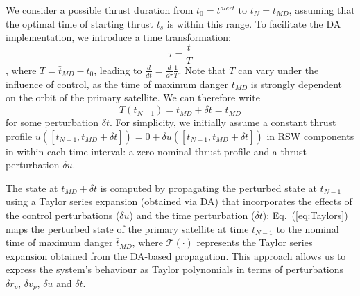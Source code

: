 \documentclass[letterpaper, preprint, paper,11pt]{AAS}	%
\renewcommand{\eqref}[1]{Eq.~(\ref{#1})}
\begin{document}
We consider a possible thrust duration from $t_0 = t^{alert}$ to $t_N = \bar{t}_{MD}$, assuming that the optimal time of starting thrust $t_s$ is within this range. To facilitate the DA implementation, we introduce a time transformation:
\begin{equation}\label{eq:Tau}
	\tau = \frac{t}{T} 	
\end{equation} 
, where $T = \bar{t}_{MD} - t_0$, leading to $\frac{d}{dt} = \frac{d}{d \tau} \frac{1}{T}$. Note that $T$ can vary under the influence of control, as the time of maximum danger $t_{MD}$ is strongly dependent on the orbit of the primary satellite. We can therefore write 
\begin{equation}
	T(t_{N-1}) = \bar{t}_{MD} + \delta t = t_{MD}
\end{equation}
for some perturbation $\delta t$. For simplicity, we initially assume a constant thrust profile  $u([t_{N-1}, \bar{t}_{MD} + \delta t]) = 0 + \delta u([t_{N-1} , \bar{t}_{MD} + \delta t])$ in RSW components in within each time interval: a zero nominal thrust profile and a thrust perturbation $\delta u$.

The state at $t_{MD} + \delta t$ is computed by propagating the perturbed state at $t_{N-1}$ using a Taylor series expansion (obtained via DA) that incorporates the effects of the control perturbations ($\delta u$) and the time perturbation ($\delta t$): \eqref{eq:Taylors} maps the perturbed state of the primary satellite at time $t_{N-1}$ to the nominal time of maximum danger $\bar{t}_{MD}$, where $\mathcal{T}(\cdot)$ represents the Taylor series expansion obtained from the DA-based propagation. This approach allows us to express the system's behaviour as Taylor polynomials in terms of perturbations $\delta r_p$, $\delta v_p$, $\delta u$ and $\delta t$. 
\end{document}
